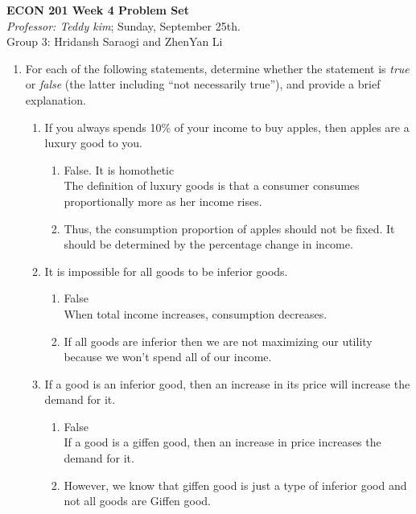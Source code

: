 \documentclass[11pt]{article}
\begin{document}
\begin{center}
\textbf{ECON 201 Week 4 Problem Set}\\
\textit {Professor: Teddy kim};  
Sunday, September 25th.
\\Group 3: Hridansh Saraogi and ZhenYan Li
\end{center}

\begin{enumerate}
\item For each of the following statements, determine whether
the statement is \emph{true} or \emph{false} (the latter including ``not necessarily true''), and provide a brief explanation.

    \begin{enumerate}
    \item If you always spends 10\% of your income to buy apples, then apples are a luxury good to you.
    \begin{enumerate}
        \item False. It is homothetic\\
        The definition of luxury goods is that a consumer consumes proportionally more as her income rises. \item Thus, the consumption proportion of apples should not be fixed. It should be determined by the percentage change in income.
    \end{enumerate}

    \item It is impossible for all goods to be inferior goods.
    \begin{enumerate}
        \item False\\
        When total income increases, consumption decreases.
        \item If all goods are inferior then we are not maximizing our utility because we won’t spend all of our income.
    \end{enumerate}

    \item If a good is an inferior good, then an increase in its price will increase the demand for it.
    \begin{enumerate}
        \item False\\
        If a good is a giffen good, then an increase in price increases the demand for it.
        \item However, we know that giffen good is just a type of inferior good and not all goods are Giffen good.
    \end{enumerate}


\end{enumerate}
\end{enumerate}
\end{document}
